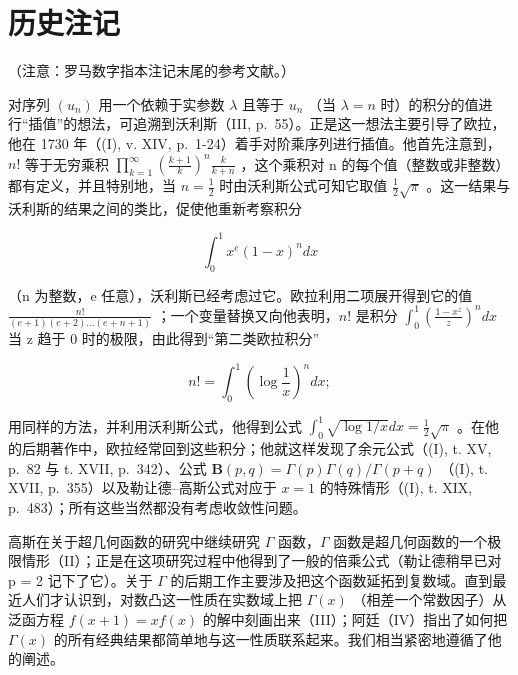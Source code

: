 \section*{历史注记}
{}

（注意：罗马数字指本注记末尾的参考文献。）

对序列 \((u_{n})\) 用一个依赖于实参数 \(\lambda\) 且等于 \(u_{n}\) （当 \(\lambda = n\) 时）的积分的值进行``插值''的想法，可追溯到沃利斯（III, p.~55）。正是这一想法主要引导了欧拉，他在 1730 年（(I), v. XIV, p.~1-24）着手对阶乘序列进行插值。他首先注意到，\(n!\) 等于无穷乘积 \(\prod_{k=1}^{\infty}\left(\frac{k+1}{k}\right)^{n}\frac{k}{k+n}\) ，这个乘积对 n 的每个值（整数或非整数）都有定义，并且特别地，当 \(n = \frac{1}{2}\) 时由沃利斯公式可知它取值 \(\frac{1}{2}\sqrt{\pi}\) 。这一结果与沃利斯的结果之间的类比，促使他重新考察积分

\[
\int_ {0} ^ {1} x ^ {e} (1 - x) ^ {n} d x
\]

（n 为整数，e 任意），沃利斯已经考虑过它。欧拉利用二项展开得到它的值 \(\frac{n!}{(e+1)(e+2)\ldots(e+n+1)}\) ；一个变量替换又向他表明，\(n!\) 是积分 \(\int_{0}^{1}\left(\frac{1-x^{z}}{z}\right)^{n}dx\) 当 z 趋于 0 时的极限，由此得到``第二类欧拉积分''

\[
n! = \int_ {0} ^ {1} \left(\log \frac {1}{x}\right) ^ {n} d x;
\]

用同样的方法，并利用沃利斯公式，他得到公式 \(\int_0^1\sqrt{\log 1 / x} dx = \frac{1}{2}\sqrt{\pi}\) 。在他的后期著作中，欧拉经常回到这些积分；他就这样发现了余元公式（(I), t. XV, p.~82 与 t. XVII, p.~342）、公式 \(\mathbf{B}(p,q) = \Gamma (p)\Gamma (q) / \Gamma (p + q)\) （(I), t. XVII, p.~355）以及勒让德–高斯公式对应于 \(x = 1\) 的特殊情形（(I), t. XIX, p.~483）；所有这些当然都没有考虑收敛性问题。

高斯在关于超几何函数的研究中继续研究 \(\Gamma\) 函数，\(\Gamma\) 函数是超几何函数的一个极限情形（II）；正是在这项研究过程中他得到了一般的倍乘公式（勒让德稍早已对 p = 2 记下了它）。关于 \(\Gamma\) 的后期工作主要涉及把这个函数延拓到复数域。直到最近人们才认识到，对数凸这一性质在实数域上把 \(\Gamma(x)\) （相差一个常数因子）从泛函方程 \(f(x + 1) = x f(x)\) 的解中刻画出来（III）；阿廷（IV）指出了如何把 \(\Gamma(x)\) 的所有经典结果都简单地与这一性质联系起来。我们相当紧密地遵循了他的阐述。

